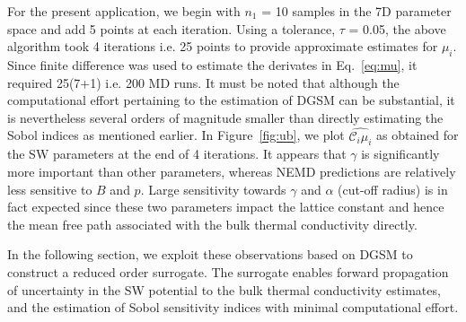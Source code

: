 For the present application, we begin with $n_1$ = 10 samples in the 7D parameter space and add 5 points
at each iteration. Using a tolerance, $\tau$ = 0.05, the above algorithm took 4 iterations i.e. 25 points to 
provide approximate estimates for $\mu_i$. Since finite difference was used to estimate the derivates in
Eq.~\ref{eq:mu}, it required 25(7+1) i.e. 200 MD runs. It must be noted that although the computational effort
pertaining to the estimation of DGSM can be substantial, it is nevertheless several orders of magnitude smaller
than directly estimating the Sobol indices as mentioned earlier. 
In Figure~\ref{fig:ub}, we plot $\hat{\mathcal{C}_i\mu_i}$ as obtained for the SW parameters at the 
end of 4 iterations. It appears that $\gamma$ is significantly more important than other parameters, whereas NEMD
predictions are relatively less sensitive to $B$ and $p$. Large sensitivity towards 
$\gamma$ and $\alpha$ (cut-off radius) is in fact expected since  these two parameters impact the lattice
constant and hence the mean free path associated with the bulk thermal conductivity directly. 

In the following section, we exploit these observations based on DGSM to construct a reduced order surrogate.
The surrogate enables forward propagation of uncertainty in the SW potential to the bulk thermal conductivity 
estimates, and the estimation of Sobol sensitivity indices with minimal computational effort. 




























